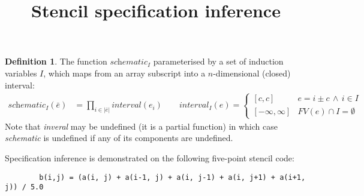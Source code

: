 \documentclass[acmlarge,review]{acmart}
\title{Stencil specification inference}
\theoremstyle{definition}
\newtheorem{defn}{Definition}
\theoremstyle{plain}
\theoremstyle{remark}
\begin{document}
\maketitle

\noindent
\begin{defn}
The function $\textit{schematic}_I$ parameterised by
a set of induction variables $I$, which maps
from an array subscript into a $n$-dimensional (closed) interval:
%
\begin{align*}
\textit{schematic}_I(\bar{e}) & =
\prod_{i \in |\bar{e}|} \textit{interval}(e_i)
\qquad
\textit{interval}_I(e) = \begin{cases}
[c, c] & e = i \pm c \, \wedge \, i \in I \\
[-\infty, \infty] & FV(e) \cap I = \emptyset
\end{cases}
\end{align*}
Note that \textit{inveral} may be undefined (it is a partial function)
in which case \textit{schematic} is undefined if any of its
components are undefined.
\end{defn}

\noindent
Specification inference is demonstrated on the following five-point
stencil code:
%
\begin{center}
\begin{verbatim}
        b(i,j) = (a(i, j) + a(i-1, j) + a(i, j-1) + a(i, j+1) + a(i+1, j)) / 5.0
\end{verbatim}
\end{center}
%
\end{document}
